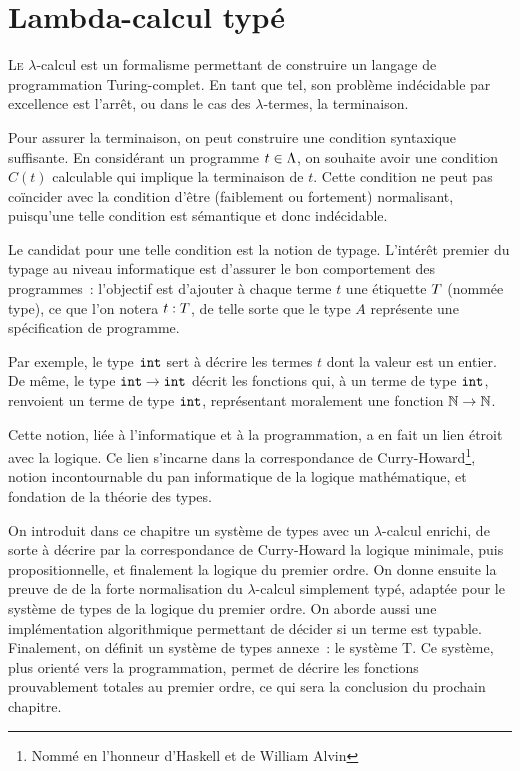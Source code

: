 \chapter{Lambda-calcul typé}
\label{chp.lambda_type}

\minitoc

\lettrine{L}{e} $\lambda$-calcul est un formalisme permettant de construire un
langage de programmation Turing-complet. En tant que tel, son problème
indécidable par excellence est l'arrêt, ou dans le cas des $\lambda$-termes,
la terminaison.

Pour assurer la terminaison, on peut construire une condition syntaxique
suffisante. En considérant un programme $t \in \Lambda$, on souhaite avoir une
condition $C(t)$ calculable qui implique la terminaison de $t$. Cette condition
ne peut pas coïncider avec la condition d'être (faiblement ou fortement)
normalisant, puisqu'une telle condition est sémantique et donc indécidable.

Le candidat pour une telle condition est la notion de typage. L'intérêt premier
du typage au niveau informatique est d'assurer le bon comportement des
programmes~: l'objectif est d'ajouter à chaque terme $t$ une étiquette
$T$ (nommée type), ce que l'on notera $t : T$, de telle sorte que
le type $A$ représente une spécification de programme.

Par exemple, le type ${\normalfont\texttt{int}}$ sert à décrire les termes $t$ dont la valeur est
un entier. De même, le type ${\normalfont\texttt{int}} \to {\normalfont\texttt{int}}$ décrit les fonctions qui, à un
terme de type ${\normalfont\texttt{int}}$, renvoient un terme de type ${\normalfont\texttt{int}}$, représentant
moralement une fonction $\mathbb N \to \mathbb N$.

Cette notion,  liée à l'informatique et à la programmation,
a en fait un lien étroit avec la logique. Ce lien s'incarne dans la
correspondance de
Curry-Howard\footnote{Nommé en l'honneur d'Haskell  et de William
Alvin }, notion incontournable du pan informatique de la
logique mathématique, et fondation de la théorie des types.

On introduit dans ce chapitre un système de types avec un $\lambda$-calcul
enrichi, de sorte à décrire par la correspondance de Curry-Howard la logique
minimale, puis propositionnelle, et finalement la logique du premier ordre.
On donne ensuite la preuve de \cite{Tait1967} de la forte normalisation du
$\lambda$-calcul simplement typé, adaptée pour le système de types de la logique
du premier ordre.
On aborde aussi une implémentation algorithmique permettant de décider si un
terme est typable.
Finalement, on définit un système de types annexe~: le système T. Ce système,
plus orienté vers la programmation, permet de décrire les fonctions
prouvablement totales au premier ordre, ce qui sera la conclusion du prochain
chapitre.

